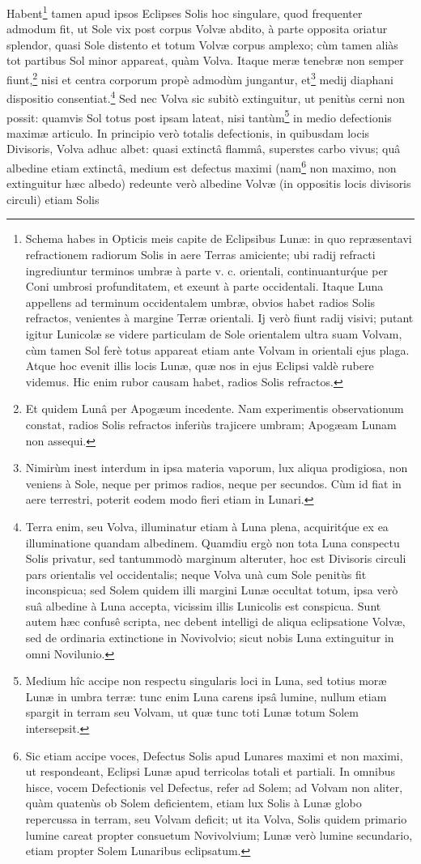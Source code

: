 \documentclass[a4paper, 11pt, oneside, polutonikogreek, german]{article}
\begin{document}
Habent\footnote{Schema habes in Opticis meis capite de Eclipsibus Lunæ: in quo repræsentavi refractionem radiorum Solis in aere Terras amiciente; ubi radij refracti ingrediuntur terminos umbræ à parte v. c. orientali, continuantur\'que per Coni umbrosi profunditatem, et exeunt à parte occidentali. Itaque Luna appellens ad terminum occidentalem umbræ, obvios habet radios Solis refractos, venientes à margine Terræ orientali. Ij verò fiunt radij visivi; putant igitur Lunicolæ se videre particulam de Sole orientalem ultra suam Volvam, cùm tamen Sol ferè totus appareat etiam ante Volvam in orientali ejus plaga. Atque hoc evenit illis locis Lunæ, quæ nos in ejus Eclipsi valdè rubere videmus. Hic enim rubor causam habet, radios Solis refractos.} tamen apud ipsos Eclipses Solis hoc singulare, quod frequenter admodum fit, ut Sole vix post corpus Volvæ abdito, à parte opposita oriatur splendor, quasi Sole distento et totum Volvæ corpus amplexo; cùm tamen aliàs tot partibus Sol minor appareat, quàm Volva. Itaque meræ tenebræ non semper fiunt,\footnote{Et quidem Lunâ per Apogæum incedente. Nam experimentis observationum constat, radios Solis refractos inferiùs trajicere umbram; Apogæam Lunam non assequi.} nisi et centra corporum propè admodùm jungantur, et\footnote{Nimirùm inest interdum in ipsa materia vaporum, lux aliqua prodigiosa, non veniens à Sole, neque per primos radios, neque per secundos. Cùm id fiat in aere terrestri, poterit eodem modo fieri etiam in Lunari.} medij diaphani dispositio consentiat.\footnote{Terra enim, seu Volva, illuminatur etiam à Luna plena, acquirit\'que ex ea illuminatione quandam albedinem. Quamdiu ergò non tota Luna conspectu Solis privatur, sed tantummodò marginum alteruter, hoc est Divisoris circuli pars orientalis vel occidentalis; neque Volva unà cum Sole penitùs fit inconspicua; sed Solem quidem illi margini Lunæ occultat totum, ipsa verò suâ albedine à Luna accepta, vicissim illis Lunicolis est conspicua. Sunt autem hæc confusê scripta, nec debent intelligi de aliqua eclipsatione Volvæ, sed de ordinaria extinctione in Novivolvio; sicut nobis Luna extinguitur in omni Novilunio.} Sed nec Volva sic subitò extinguitur, ut penitùs cerni non possit: quamvis Sol totus post ipsam lateat, nisi tantùm\footnote{Medium hîc accipe non respectu singularis loci in Luna, sed totius moræ Lunæ in umbra terræ: tunc enim Luna carens ipsâ lumine, nullum etiam spargit in terram seu Volvam, ut quæ tunc toti Lunæ totum Solem intersepsit.} in medio defectionis maximæ articulo. In principio verò totalis defectionis, in quibusdam locis Divisoris, Volva adhuc albet: quasi extinctâ flammâ, superstes carbo vivus; quâ albedine etiam extinctâ, medium est defectus maximi (nam\footnote{Sic etiam accipe voces, Defectus Solis apud Lunares maximi et non maximi, ut respondeant, Eclipsi Lunæ apud terricolas totali et partiali. In omnibus hisce, vocem Defectionis vel Defectus, refer ad Solem; ad Volvam non aliter, quàm quatenùs ob Solem deficientem, etiam lux Solis à Lunæ globo repercussa in terram, seu Volvam deficit; ut ita Volva, Solis quidem primario lumine careat propter consuetum Novivolvium; Lunæ verò lumine secundario, etiam propter Solem Lunaribus eclipsatum.} non maximo, non extinguitur hæc albedo) redeunte verò albedine Volvæ (in oppositis locis divisoris circuli) etiam Solis 
\end{document}
